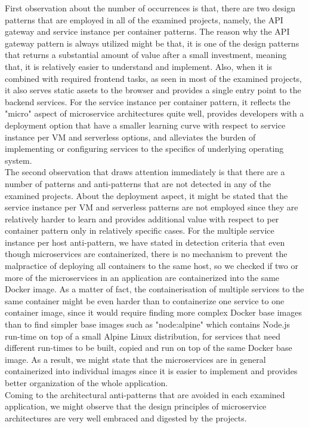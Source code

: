 \documentclass{Configuration_Files/PoliMi3i_thesis}
\begin{document}
First observation about the number of occurrences is that, there are two design patterns that are employed in all of the examined projects, namely, the API gateway and service instance per container patterns.
The reason why the API gateway pattern is always utilized might be that, it is one of the design patterns that returns a substantial amount of value after a small investment, meaning that, it is relatively easier to understand and implement.
Also, when it is combined with required frontend tasks, as seen in most of the examined projects, it also serves static assets to the browser and provides a single entry point to the backend services.
For the service instance per container pattern, it reflects the "micro" aspect of microservice architectures quite well, provides developers with a deployment option that have a smaller learning curve with respect to service instance per VM and serverless options, and alleviates the burden of implementing or configuring services to the specifics of underlying operating system.
\\
The second observation that draws attention immediately is that there are a number of patterns and anti-patterns that are not detected in any of the examined projects.
About the deployment aspect, it might be stated that the service instance per VM and serverless patterns are not employed since they are relatively harder to learn and provides additional value with respect to per container pattern only in relatively specific cases.
For the multiple service instance per host anti-pattern, we have stated in detection criteria that even though microservices are containerized, there is no mechanism to prevent the malpractice of deploying all containers to the same host, so we checked if two or more of the microservices in an application are containerized into the same Docker image.
As a matter of fact, the containerisation of multiple services to the same container might be even harder than to containerize one service to one container image, since it would require finding more complex Docker base images than to find simpler base images such as "node:alpine" which contains Node.js run-time on top of a small Alpine Linux distribution, for services that need different run-times to be built, copied and run on top of the same Docker base image.
As a result, we might state that the microservices are in general containerized into individual images since it is easier to implement and provides better organization of the whole application.
\\
Coming to the architectural anti-patterns that are avoided in each examined application, we might observe that the design principles of microservice architectures are very well embraced and digested by the projects.
\end{document}
